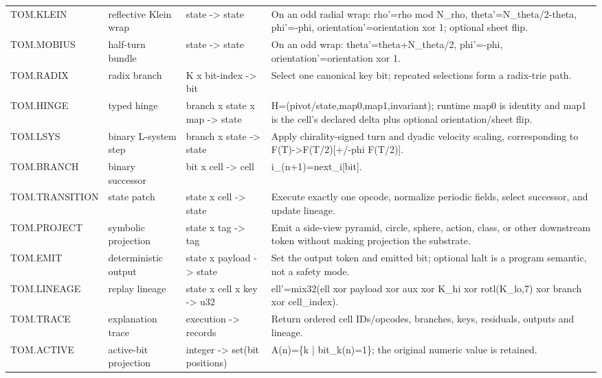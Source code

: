 \begin{longtable}{@{}L{0.18\textwidth}L{0.17\textwidth}L{0.20\textwidth}L{0.39\textwidth}@{}}
TOM.KLEIN & reflective Klein wrap & state -> state & On an odd radial wrap: rho'=rho mod N\_rho,\allowbreak{} theta'=N\_theta/\allowbreak{}2-theta,\allowbreak{} phi'=-phi,\allowbreak{} orientation'=orientation xor 1;\allowbreak{} optional sheet flip. \\
TOM.MOBIUS & half-turn bundle & state -> state & On an odd wrap: theta'=theta+N\_theta/\allowbreak{}2,\allowbreak{} phi'=-phi,\allowbreak{} orientation'=orientation xor 1. \\
TOM.RADIX & radix branch & K x bit-index -> bit & Select one canonical key bit;\allowbreak{} repeated selections form a radix-trie path. \\
TOM.HINGE & typed hinge & branch x state x map -> state & H=(pivot/\allowbreak{}state,\allowbreak{}map0,\allowbreak{}map1,\allowbreak{}invariant);\allowbreak{} runtime map0 is identity and map1 is the cell's declared delta plus optional orientation/\allowbreak{}sheet flip. \\
TOM.LSYS & binary L-system step & branch x state -> state & Apply chirality-signed turn and dyadic velocity scaling,\allowbreak{} corresponding to F(T)->F(T/\allowbreak{}2)[+/\allowbreak{}-phi F(T/\allowbreak{}2)]. \\
TOM.BRANCH & binary successor & bit x cell -> cell & i\_(n+1)=next\_i[bit]. \\
TOM.TRANSITION & state patch & state x cell -> state & Execute exactly one opcode,\allowbreak{} normalize periodic fields,\allowbreak{} select successor,\allowbreak{} and update lineage. \\
TOM.PROJECT & symbolic projection & state x tag -> tag & Emit a side-view pyramid,\allowbreak{} circle,\allowbreak{} sphere,\allowbreak{} action,\allowbreak{} class,\allowbreak{} or other downstream token without making projection the substrate. \\
TOM.EMIT & deterministic output & state x payload -> state & Set the output token and emitted bit;\allowbreak{} optional halt is a program semantic,\allowbreak{} not a safety mode. \\
TOM.LINEAGE & replay lineage & state x cell x key -> u32 & ell'=mix32(ell xor payload xor aux xor K\_hi xor rotl(K\_lo,\allowbreak{}7) xor branch xor cell\_index). \\
TOM.TRACE & explanation trace & execution -> records & Return ordered cell IDs/\allowbreak{}opcodes,\allowbreak{} branches,\allowbreak{} keys,\allowbreak{} residuals,\allowbreak{} outputs and lineage. \\
TOM.ACTIVE & active-bit projection & integer -> set(bit positions) & A(n)=\{k | bit\_k(n)=1\};\allowbreak{} the original numeric value is retained. \\

\end{longtable}
